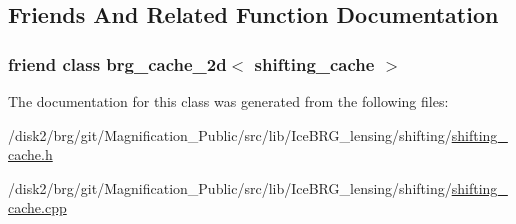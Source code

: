 \subsection{Friends And Related Function Documentation}
\hypertarget{classIceBRG_1_1shifting__cache_a4753ec11cca5a88c552ffaa19a8e43cf}{
\subsubsection[{brg\-\_\-cache\-\_\-2d$<$ shifting\-\_\-cache $>$}]{\setlength{\rightskip}{0pt plus 5cm}friend class {\bf brg\-\_\-cache\-\_\-2d}$<$ {\bf shifting\-\_\-cache} $>$\hspace{0.3cm}{\ttfamily [friend]}}}\label{classIceBRG_1_1shifting__cache_a4753ec11cca5a88c552ffaa19a8e43cf}


The documentation for this class was generated from the following files\-:\begin{DoxyCompactItemize}
\item 
/disk2/brg/git/\-Magnification\-\_\-\-Public/src/lib/\-Ice\-B\-R\-G\-\_\-lensing/shifting/\hyperlink{shifting__cache_8h}{shifting\-\_\-cache.\-h}\item 
/disk2/brg/git/\-Magnification\-\_\-\-Public/src/lib/\-Ice\-B\-R\-G\-\_\-lensing/shifting/\hyperlink{shifting__cache_8cpp}{shifting\-\_\-cache.\-cpp}\end{DoxyCompactItemize}
